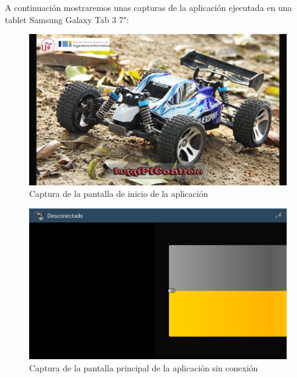 \documentclass{pclass}
\begin{document}
\begin{itemize}
\begin{itemize}
	\clearpage
	A continuación mostraremos unas capturas de la aplicación ejecutada en una tablet Samsung Galaxy Tab 3 7":
	
	\begin{figure}[H]
		\centering
		\includegraphics[width=1\textwidth]{img/inicio}
		\caption{Captura de la pantalla de inicio de la aplicación}
		\label{fig:capturaInicio}
	\end{figure}

	\begin{figure}[H]
		\centering
		\includegraphics[width=1\textwidth]{img/sin_conexion}
		\caption{Captura de la pantalla principal de la aplicación sin conexión}
		\label{fig:capturaSinConexion}
	\end{figure}


\end{itemize}
\end{itemize}
\end{document}
